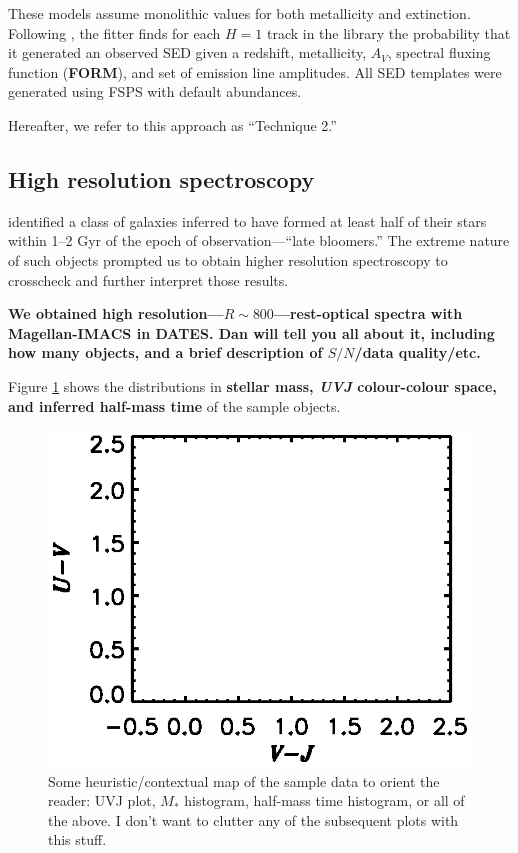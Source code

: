 \documentclass[a4paper,fleqn,usenatbib]{mnras}
\newcommand{\Mstel}{M_\ast}
\newcommand{\bfr}{\bf\color{red}}
\newcommand{\bfb}{\color{myblue}}
\newcommand{\tobs}{t_{\rm obs}}
\begin{document}
These models assume monolithic values for both metallicity and extinction. Following 
\citealt{Pacifici12}, the fitter finds for each $H=1$ track in the library the probability that it generated
an observed SED given a redshift, metallicity, $A_{V}$, spectral fluxing function ({\bfr FORM}), and 
set of emission line amplitudes. All SED templates were generated using FSPS with default abundances.

Hereafter, we refer to this approach as ``Technique 2.''

\subsection{High resolution spectroscopy}
\label{sec:hiRes}

\citet{Dressler16, Dressler18} identified a class of galaxies inferred to have formed at least half of 
their stars within 1--2 Gyr of the epoch of observation---``late bloomers.'' The extreme nature of such objects
prompted us to obtain higher resolution spectroscopy to crosscheck and further interpret those results. 

{\bfr We obtained high resolution---$R\sim800$---rest-optical spectra with Magellan-IMACS in DATES. 
Dan will tell you all about it, including how many objects, and a brief description of $S/N$/data quality/etc.}

Figure \ref{fig:sample} shows the distributions in {\bfr stellar mass, {\it UVJ} colour-colour space, 
and inferred half-mass time} of the sample objects.

\begin{figure}
	\centering
	\includegraphics[width = \columnwidth, trim=1cm 0.7cm 0cm 3cm]{context}
	\caption{\bfb Some heuristic/contextual map of the sample data to orient the reader: UVJ plot, 
			$\Mstel$ histogram, half-mass time histogram, or all of the above. I don't want to 
			clutter any of the subsequent plots with this stuff.}
	\label{fig:sample}
\end{figure}
\end{document}
